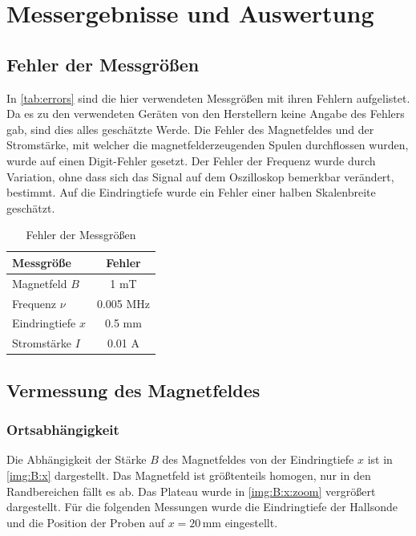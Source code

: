 \section{Messergebnisse und Auswertung}
\subsection{Fehler der Messgrößen}
In \autoref{tab:errors} sind die hier verwendeten Messgrößen mit ihren Fehlern aufgelistet. Da es zu den verwendeten Geräten von den Herstellern 
keine Angabe des Fehlers gab, sind dies alles geschätzte Werde. Die Fehler des Magnetfeldes und der Stromstärke, mit welcher die magnetfelderzeugenden 
Spulen durchflossen wurden, wurde auf einen Digit-Fehler gesetzt. Der Fehler der Frequenz wurde durch Variation, ohne dass sich das Signal auf dem 
Oszilloskop bemerkbar verändert, bestimmt. Auf die Eindringtiefe wurde ein Fehler einer halben Skalenbreite geschätzt.
\begin{table}[H]
\begin{center}
\begin{tabular}{|l|c|}
  \hline
  \textbf{Messgröße} & \textbf{Fehler} \\ \hline
  Magnetfeld $B$ & 1 mT \\ \hline
  Frequenz $\nu$ & 0.005 MHz \\ \hline
  Eindringtiefe $x$ & 0.5 mm \\ \hline
  Stromstärke $I$ & 0.01 A \\ \hline 
\end{tabular}
\caption{Fehler der Messgrößen}
\label{tab:errors}
\end{center}
\end{table}

\subsection{Vermessung des Magnetfeldes}
\subsubsection{Ortsabhängigkeit}
Die Abhängigkeit der Stärke $B$ des Magnetfeldes von der Eindringtiefe $x$ ist in \autoref{img:B:x} dargestellt. 
Das Magnetfeld ist größtenteils homogen, nur in den Randbereichen fällt es ab. Das Plateau wurde in \autoref{img:B:x:zoom} vergrößert 
dargestellt. Für die folgenden Messungen wurde die Eindringtiefe der Hallsonde und die Position der Proben auf $x=20$\,mm eingestellt.

